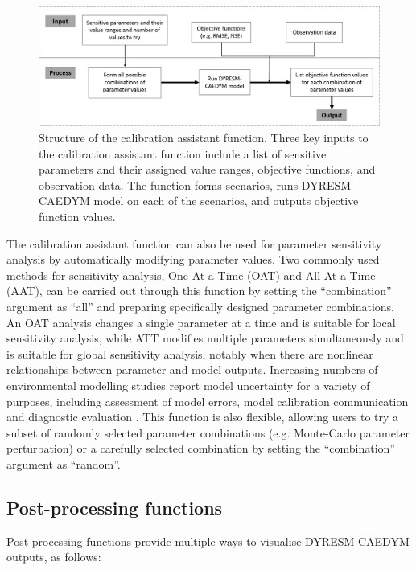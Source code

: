 \begin{figure}[ht]
    \centering
    \includegraphics[scale = 0.39]{Figure2}
    \caption{Structure of the calibration assistant function. Three key inputs to the calibration assistant function include a list of sensitive parameters and their assigned value ranges, objective functions, and observation data. The function forms scenarios, runs DYRESM-CAEDYM model on each of the scenarios, and outputs objective function values.}
    \label{figure2}
\end{figure}

The calibration assistant function can also be used for parameter sensitivity analysis by automatically modifying parameter values. Two commonly used methods for sensitivity analysis, One At a Time (OAT) and All At a Time (AAT), can be carried out through this function by setting the “combination” argument as “all” and preparing specifically designed parameter combinations. An OAT analysis changes a single parameter at a time and is suitable for local sensitivity analysis, while ATT modifies multiple parameters simultaneously and is suitable for global sensitivity analysis, notably when there are nonlinear relationships between parameter and model outputs. Increasing numbers of environmental modelling studies report model uncertainty for a variety of purposes, including assessment of model errors, model calibration communication and diagnostic evaluation \citep{couture2018simulating,dietzel2014bayesian,pianosi2016sensitivity}. This function is also flexible, allowing users to try a subset of randomly selected parameter combinations (e.g. Monte-Carlo parameter perturbation) or a carefully selected combination by setting the “combination” argument as “random”.\par

\subsection{Post-processing functions}

Post-processing functions provide multiple ways to visualise DYRESM-CAEDYM outputs, as follows:


